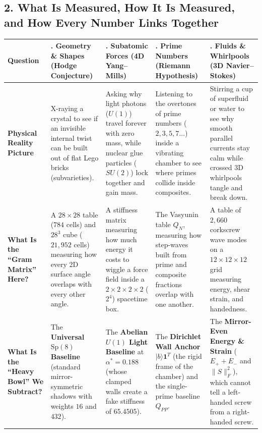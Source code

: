 \documentclass[11pt,a4paper]{article}
\begin{document}
\subsection*{2. What Is Measured, How It Is Measured, and How Every Number Links Together}

\begin{center}
\scriptsize
\begin{tabular}{@{}>{\raggedright\arraybackslash}p{2.2cm}>{\raggedright\arraybackslash}p{2.95cm}>{\raggedright\arraybackslash}p{2.95cm}>{\raggedright\arraybackslash}p{2.95cm}>{\raggedright\arraybackslash}p{2.95cm}@{}}
\toprule
Question & 1. Geometry \& Shapes (Hodge Conjecture) & 2. Subatomic Forces (4D Yang--Mills) & 3. Prime Numbers (Riemann Hypothesis) & 4. Fluids \& Whirlpools (3D Navier--Stokes) \\
\midrule
\textbf{Physical Reality Picture} &
X-raying a crystal to see if an invisible internal twist can be built out of flat Lego bricks (subvarieties). &
Asking why light photons ($U(1)$) travel forever with zero mass, while nuclear glue particles ($SU(2)$) lock together and gain mass. &
Listening to the overtones of prime numbers ($2,3,5,7\dots$) inside a vibrating chamber to see where primes collide inside composites. &
Stirring a cup of superfluid or water to see why smooth parallel currents stay calm while crossed 3D whirlpools tangle and break down. \\
\addlinespace
\textbf{What Is the ``Gram Matrix'' Here?} &
A $28\times 28$ table ($784$ cells) and $28^3$ cube ($21{,}952$ cells) measuring how every 2D surface angle overlaps with every other angle. &
A stiffness matrix measuring how much energy it costs to wiggle a force field inside a $2\times 2\times 2\times 2$ ($2^4$) spacetime box. &
The Vasyunin table $Q_N$, measuring how step-waves built from prime and composite fractions overlap with one another. &
A table of $2{,}660$ corkscrew wave modes on a $12\times 12\times 12$ grid measuring energy, shear strain, and handedness. \\
\addlinespace
\textbf{What Is the ``Heavy Bowl'' We Subtract?} &
The \textbf{Universal $\mathrm{Sp}(8)$ Baseline} (standard mirror-symmetric shadows with weights $16$ and $432$). &
The \textbf{Abelian $U(1)$ Light Baseline} at $\alpha^*=0.188$ (whose clamped walls create a fake stiffness of $65.4505$). &
The \textbf{Dirichlet Wall Anchor} $|b\rangle\mathbf{1}^T$ (the rigid frame of the chamber) and the single-prime baseline $Q_{PP}$. &
The \textbf{Mirror-Even Energy \& Strain} ($E_+ + E_-$ and $\|S\|_F^2$), which cannot tell a left-handed screw from a right-handed screw. \\

\end{tabular}
\end{center}
\end{document}
